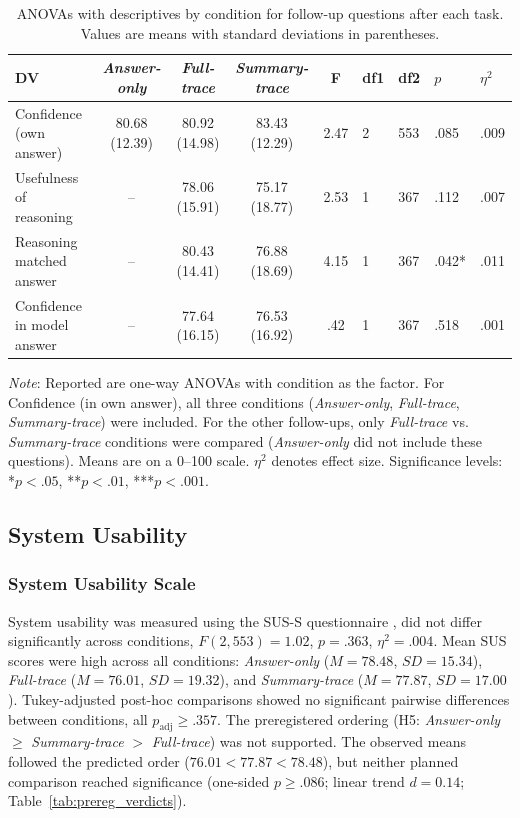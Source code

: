 \documentclass[manuscript,review,anonymous]{acmart}
\begin{document}
\begin{table}[!htp]
\centering

\caption{ANOVAs with descriptives by condition for follow-up questions after each task. Values are means with standard deviations in parentheses.}

\begin{tabular}{lccccllll}
\hline DV             & \textit{Answer-only} & \textit{Full-trace}       & \textit{Summary-trace}    & F    & df1 & df2 & $p$     & $\eta^2$ \\ \hline
Confidence (own answer)   & 80.68 (12.39)  & 80.92 (14.98)  & 83.43 (12.29)  & 2.47 & 2  & 553 & .085  & .009     \\
Usefulness of reasoning   & --  & 78.06 (15.91)   & 75.17 (18.77)   & 2.53 & 1   & 367  & .112     &  .007  \\
Reasoning matched answer  & --  & 80.43 (14.41)  & 76.88 (18.69)  & 4.15 & 1   & 367  & .042*   & .011   \\
Confidence in model answer    & --   & 77.64 (16.15)   & 76.53 (16.92)   & .42 & 1   & 367  &  .518 & .001      \\
\hline
\end{tabular}

\raggedright \small  \textit{Note}: Reported are one-way ANOVAs with condition as the factor. For Confidence (in own answer), all three conditions (\textit{Answer-only}, \textit{Full-trace}, \textit{Summary-trace}) were included. For the other follow-ups, only \textit{Full-trace} vs. \textit{Summary-trace} conditions were compared (\textit{Answer-only }did not include these questions). Means are on a 0--100 scale. $\eta^2$ denotes effect size. Significance levels: *$p < .05$, **$p < .01$, ***$p < .001$.
\end{table}


\subsection{System Usability}
\subsubsection{System Usability Scale} System usability was measured using the SUS-S questionnaire \cite{brooke1996sus,bangor2008empirical}, did not differ significantly across conditions, $F(2, 553) = 1.02$, $p = .363$, $\eta^2 = .004$. Mean SUS scores were high across all conditions: \textit{Answer-only} ($M = 78.48$, $SD = 15.34$), \textit{Full-trace} ($M = 76.01$, $SD = 19.32$), and \textit{Summary-trace} ($M = 77.87$, $SD = 17.00$). Tukey-adjusted post-hoc comparisons showed no significant pairwise differences between conditions, all $p_{\mathrm{adj}} \geq .357$. The preregistered ordering (H5: \textit{Answer-only} $\geq$ \textit{Summary-trace} $>$ \textit{Full-trace}) was not supported. The observed means followed the predicted order ($76.01 < 77.87 < 78.48$), but neither planned comparison reached significance (one-sided $p \geq .086$; linear trend $d = 0.14$; Table~\ref{tab:prereg_verdicts}).
\end{document}
